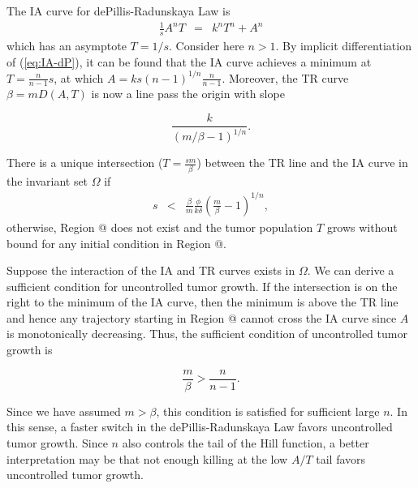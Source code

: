 \documentclass[review,authoryear]{elsarticle}
\makeatletter
\newcommand*{\rom}[1]{\expandafter\@slowromancap\romannumeral #1@}
\makeatother
\begin{document}
 The IA curve for dePillis-Radunskaya Law is
\begin{eqnarray}
\frac{1}{s}A^{n}T & = & k^{n}T^{n}+A^{n}\label{eq:IA-dP}
\end{eqnarray}
which has an asymptote $T=1/s$. Consider here $n>1$. 
By implicit differentiation of (\ref{eq:IA-dP}), it can be found
that the IA curve achieves a minimum at $T=\frac{n}{n-1}s$, at which
$A=ks(n-1)^{1/n}\frac{n}{n-1}$. Moreover, the TR curve
$\beta=mD(A,T)$ is now a line pass the origin with slope 
\begin{linenomath*}
\[
\frac{k}{(m/\beta-1)^{1/n}}.
\]
\end{linenomath*}
There is a unique intersection ($T=\frac{sm}{\beta}$) between the
TR line and the IA curve in the invariant set $\Omega$ if 
\begin{eqnarray}
s & < & \frac{\beta}{m}\frac{\phi}{k\delta}(\frac{m}{\beta}-1)^{1/n},\label{eq:s<}
\end{eqnarray}
  otherwise, Region \rom{3} does not exist and the tumor population $T$ grows
without bound for any initial condition in Region \rom{2}. 

Suppose the interaction of the IA and TR curves exists in $\Omega$. We can derive
a sufficient condition for uncontrolled tumor growth. If the intersection
is on the right to the minimum of the IA curve, then the minimum is above the TR line
and hence any trajectory starting in Region \rom{2} cannot cross the IA curve
since $A$ is monotonically decreasing. Thus, the sufficient condition
of uncontrolled tumor growth is 
\begin{linenomath*}
\begin{equation}
\frac{m}{\beta}>\frac{n}{n-1}.\label{eq:sneak-thru-cond}
\end{equation}
\end{linenomath*}
Since we have assumed $m>\beta$, this condition is satisfied for sufficient large $n$. In this sense, a faster switch in the dePillis-Radunskaya
Law favors uncontrolled tumor growth. Since $n$ also controls the tail of the Hill function, a better  interpretation may be that
not enough killing at the low $A/T$ tail favors uncontrolled tumor growth. 
\end{document}
